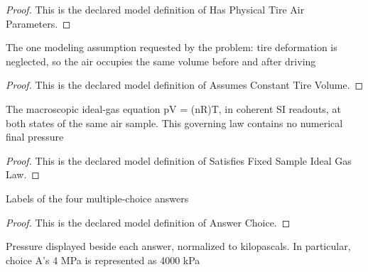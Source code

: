 \begin{proof}
  This is the declared model definition of Has Physical Tire Air Parameters.
\end{proof}
\begin{definition}
  \label{def:physics:phyx-mini-0399:phyxminiproblems-problemphyxmini0399-assumesconstanttirevolume}
  The one modeling assumption requested by the problem: tire deformation is neglected, so the air occupies the same volume before and after driving
\end{definition}
\begin{proof}
  This is the declared model definition of Assumes Constant Tire Volume.
\end{proof}
\begin{definition}
  \label{def:physics:phyx-mini-0399:phyxminiproblems-problemphyxmini0399-satisfiesfixedsampleidealgaslaw}
  The macroscopic ideal-gas equation pV = (nR)T, in coherent SI readouts, at both states of the same air sample. This governing law contains no numerical final pressure
\end{definition}
\begin{proof}
  This is the declared model definition of Satisfies Fixed Sample Ideal Gas Law.
\end{proof}
\begin{definition}
  \label{def:physics:phyx-mini-0399:phyxminiproblems-problemphyxmini0399-answerchoice}
  Labels of the four multiple-choice answers
\end{definition}
\begin{proof}
  This is the declared model definition of Answer Choice.
\end{proof}
\begin{definition}
  \label{def:physics:phyx-mini-0399:phyxminiproblems-problemphyxmini0399-displayedpressurekilopascals}
  Pressure displayed beside each answer, normalized to kilopascals. In particular, choice A's 4 MPa is represented as 4000 kPa
\end{definition}
